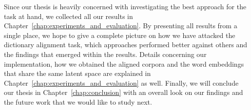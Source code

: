 Since our thesis is heavily concerned with investigating the best approach for the task at hand, we collected all our results in Chapter~\ref{chap:experiments_and_evaluation}.
By presenting all results from a single place, we hope to give a complete picture on how we have attacked the dictionary alignment task, which approaches performed better against others and the findings that emerged within the results.
Details concerning our implementation, how we obtained the aligned corpora and the word embeddings that share the same latent space are explained in Chapter~\ref{chap:experiments_and_evaluation} as well.
Finally, we will conclude our thesis in Chapter~\ref{chap:conclusion} with an overall look on our findings and the future work that we would like to study next.
